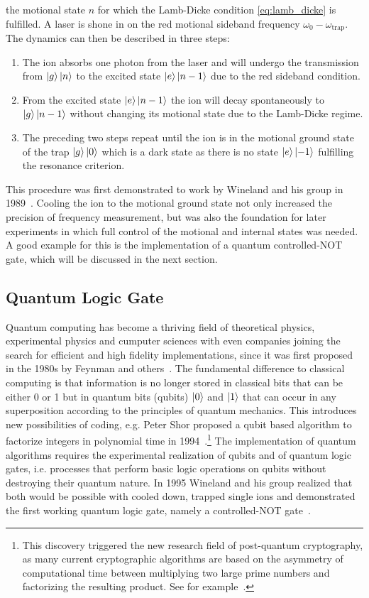 the motional state $n$ for which the Lamb-Dicke condition \eqref{eq:lamb_dicke}
is fulfilled. A laser is shone in on the red motional sideband frequency $\omega_0 -
\omega_\text{trap}$. The dynamics can then be described in three steps:
\begin{enumerate}[label=\alph*)]
  \item The ion absorbs one photon from the laser and will undergo the
    transmission from $\ket{g}\ket{n}$ to the excited state $\ket{e}\ket{n-1}$
    due to the red sideband condition.
  \item From the excited state $\ket{e}\ket{n-1}$ the ion will decay
    spontaneously to $\ket{g}\ket{n-1}$ without changing its motional state due to the Lamb-Dicke regime.
  \item The preceding two steps repeat until the ion is in the motional ground
    state of the trap $\ket{g}\ket{0}$ which is a dark state as there is no
    state $\ket{e}\ket{-1}$ fulfilling the resonance criterion.
\end{enumerate}

This procedure was first demonstrated to work by Wineland and his group in
1989~\cite{diedrich1989laser}. Cooling the ion to the motional ground state not
only increased the precision of frequency measurement, but was also the
foundation for later experiments in which full control of the motional and
internal states was needed. A good example for this is the implementation of a
quantum controlled-NOT gate, which will be discussed in the next section.

\subsection{Quantum Logic Gate}
Quantum computing has become a thriving field of theoretical physics,
experimental physics and cumputer sciences with even companies joining the search for
efficient and high fidelity implementations, since it was first proposed in
the 1980s by Feynman and others~\cite{feynman1982simulating}. The fundamental
difference to classical computing is that information is no longer stored in
classical bits that can be either 0 or 1 but in quantum bits (qubits) $\ket{0}$
and $\ket{1}$ that can occur in any superposition according to the
principles of quantum mechanics. This introduces new possibilities of coding,
e.g. Peter Shor proposed a qubit based algorithm to factorize integers in
polynomial time in 1994~\cite{shor1994algorithms}.\footnote{This discovery
triggered the new research field of post-quantum cryptography, as many current
cryptographic algorithms are based on the asymmetry of computational time
between multiplying two large prime numbers and factorizing the resulting
product. See for example~\cite{bernstein2009post}.} The implementation of
quantum algorithms requires the experimental realization of qubits and of
quantum logic gates, i.e. processes that perform basic logic operations on
qubits without destroying their quantum nature. In 1995 Wineland and his group
realized that both would be possible with cooled down, trapped single ions and
demonstrated the first working quantum logic gate, namely a controlled-NOT
gate~\cite{monroe1995demonstration}.

